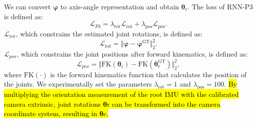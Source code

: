 %
We can convert $\boldsymbol{\varphi}$ to axis-angle representation and obtain $\boldsymbol{\theta}_\mathrm{r}$.
%
The loss of RNN-P3 is defined as:
\begin{equation}
\mathcal{L}_{P3}=\lambda_{\mathrm{rot}}\mathcal{L}_{\mathrm{rot}}+\lambda_{\mathrm{pos}}\mathcal{L}_{\mathrm{pos}}.
\end{equation}
%
$\mathcal{L}_{\mathrm{rot}}$, which constrains the estimated joint rotations, is defined as:
\begin{equation}  
\mathcal{L}_{\mathrm{rot}}=\Vert \boldsymbol{\varphi}-\boldsymbol{\varphi}^{\mathrm{GT}} \Vert_2^{2}.
\end{equation}
%
$\mathcal{L}_{pos}$, which constrains the joint positions after forward kinematics, is defined as: 
\begin{equation}  
\mathcal{L}_{pos}=\Vert \mathrm{FK}\left(\boldsymbol{\theta}_{\mathrm{r}}\right)-\mathrm{FK}\left(\boldsymbol{\theta}_\mathrm{r}^{\mathrm{GT}}\right) \Vert_2^{2},
\end{equation}
%
where $\mathrm{FK}(\cdot)$ is the forward kinematics function that calculates the position of the joints.
%
We experimentally set the parameters $\lambda_{\mathrm{rot}}=1$ and $\lambda_{\mathrm{pos}}=100$.
%
\hl{By multiplying the orientation measurement of the root IMU with the calibrated camera extrinsic, joint rotations $\boldsymbol{\theta}\mathrm{r}$ can be transformed into the camera coordinate system, resulting in $\boldsymbol{\theta}\mathrm{c}$.}
%
